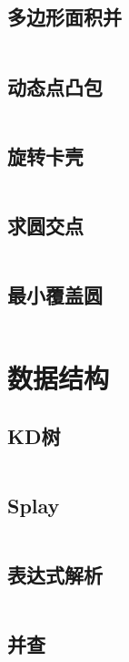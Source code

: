 \documentclass[UTF8]{ctexart}
\begin{document}
\subsection{多边形面积并}
\inputminted{cpp}{calcgeometry/多边形面积并.cpp}

\subsection{动态点凸包}
\inputminted{cpp}{calcgeometry/动态点凸包.cpp}

\subsection{旋转卡壳}
\inputminted{cpp}{calcgeometry/旋转卡壳.cpp}

\subsection{求圆交点}
\inputminted{cpp}{calcgeometry/求圆交点.cpp}

\subsection{最小覆盖圆}
\inputminted{cpp}{calcgeometry/最小覆盖圆.cpp}

\section{数据结构}

\subsection{KD树}
\inputminted{cpp}{datastructure/KD树.cpp}

\subsection{Splay}
\inputminted{cpp}{datastructure/Splay.cpp}

\subsection{表达式解析}
\inputminted{cpp}{datastructure/表达式解析.cpp}

\subsection{并查}
\inputminted{cpp}{datastructure/并查.cpp}
\end{document}
